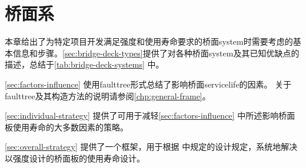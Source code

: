 \chapter{桥面系}
\label{chp:bridge-decks}
本章给出了为特定项目开发满足强度和使用寿命要求的桥面\gls*{system}时需要考虑的基本信息和步骤。\cref{sec:bridge-deck-types}提供了对各种桥面\gls*{system}及其已知优缺点的描述，总结于\cref{tab:bridge-deck-systems} 中。

\cref{sec:factors-influence} 使用\gls*{faulttree}形式总结了影响桥面\gls*{servicelife}的因素。 关于\gls*{faulttree}及其构造方法的说明请参阅\cref{chp:general-frame}。

\cref{sec:individual-strategy} 提供了可用于减轻\cref{sec:factors-influence} 中所述影响桥面板使用寿命的大多数因素的策略。

\cref{sec:overall-strategy} 提供了一个框架，用于根据 \lrfd \cite{aashto2012l}中规定的设计规定，系统地解决以强度设计的桥面板的使用寿命设计。

